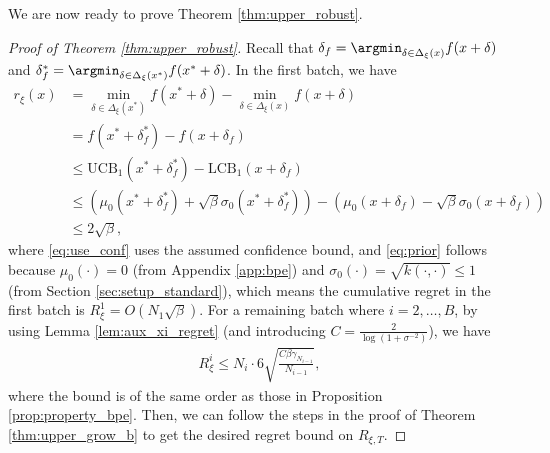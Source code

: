 \documentclass[10pt]{article}
\begin{document}
We are now ready to prove Theorem \ref{thm:upper_robust}.
\begin{proof} [Proof of Theorem \ref{thm:upper_robust}]
    Recall that $\delta_f = \argmin_{\delta\in\Delta_{\xi}(x)} f(x+\delta)$ and $\delta^*_f = \argmin_{\delta\in\Delta_{\xi}(x^*)} f(x^*+\delta)$.
    In the first batch, we have
    \begin{align}
        r_{\xi}(x) 
        & = \min_{\delta\in\Delta_{\xi}(x^*)}f(x^*+\delta) - \min_{\delta\in\Delta_{\xi}(x)}f(x+\delta) \\
        & = f(x^*+\delta^*_f) - f(x+\delta_f) \\
        & \leq \mathrm{UCB}_1(x^*+\delta^*_f) - \mathrm{LCB}_1(x+\delta_f) \label{eq:use_conf} \\
        & \leq (\mu_0(x^*+\delta^*_f)+\sqrt{\beta}\sigma_0(x^*+\delta^*_f)) - (\mu_0(x+\delta_f)-\sqrt{\beta}\sigma_0(x+\delta_f)) \\
        & \leq 2\sqrt{\beta} \label{eq:prior} ,
    \end{align}
    where \eqref{eq:use_conf} uses the assumed confidence bound, and \eqref{eq:prior} follows because $\mu_0(\cdot) = 0$ (from Appendix \ref{app:bpe}) and $\sigma_0(\cdot) = \sqrt{k(\cdot,\cdot)} \leq 1$ (from Section \ref{sec:setup_standard}),
    which means the cumulative regret in the first batch is $R_{\xi}^1=O(N_1\sqrt{\beta})$.
    For a remaining batch where $i=2,\ldots, B$, by using Lemma \ref{lem:aux_xi_regret} (and introducing $C=\frac{2}{\log(1+\sigma^{-2})}$), we have
    \begin{align}
        R_{\xi}^i
        \leq N_i \cdot 6\sqrt{\frac{C\beta\gamma_{N_{i-1}}}{N_{i-1}}},
    \end{align}
    where the bound is of the same order as those in Proposition \ref{prop:property_bpe}. Then, we can follow the steps in the proof of Theorem \ref{thm:upper_grow_b} to get the desired regret bound on $R_{\xi, T}$.
\end{proof}
\end{document}
